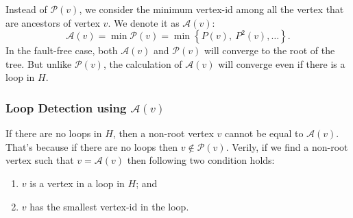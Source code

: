 Instead of $\mathcal{P}(v)$,  we consider the minimum vertex-id among all the
vertex that are ancestors of vertex $v$. We denote it as  $\mathcal{A}(v)$: 
\begin{equation}
\mathcal{A}(v) = \min\mathcal{P}(v)=\min\left\{ P(v),\ P^{2}(v),\ldots\right\}. 
\end{equation}
%
In the fault-free case, both $\mathcal{A}(v)$ and $\mathcal{P}(v)$ will
converge to the root of the tree. But unlike $\mathcal{P}(v)$, the calculation
of $\mathcal{A}(v)$ will converge even if there is a loop in $H$.

\subsubsection{Loop Detection using $\mathcal{A}(v)$}

If there are no loops in $H$, then a non-root vertex $v$ cannot be equal to
$\mathcal{A}(v)$. That's because  if there are no loops then $v\notin
\mathcal{P}(v)$.  Verily,  if we find a non-root vertex such that
$v=\mathcal{A}(v)$ then following two condition holds:
%
\begin{enumerate}
\item $v$ is a vertex in a loop in $H$; and 
\item $v$ has the smallest vertex-id in the loop.
\end{enumerate}


